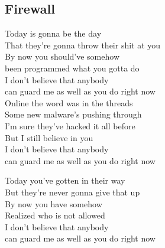 \subsection{Firewall}

 Today is gonna be the day \\
That they’re gonna throw their shit at you \\
By now you should’ve somehow  \\
been programmed what you gotta do  \\
I don’t believe that anybody \\
can guard me as well as you  do right now \ \ \  \ \  \ \ \\

Online the word was in the threads \\
Some new malware’s pushing through \\
I’m sure they’ve hacked it all before \\
But I still believe in you \\
I don’t believe that anybody \\
can guard me as well as you do right now \\



Today you’ve gotten in their way \\
But they’re never gonna give that up \\
By now you have somehow \\
Realized who is not allowed \\
I don’t believe that anybody \\
can guard me as well as you do right now \\

